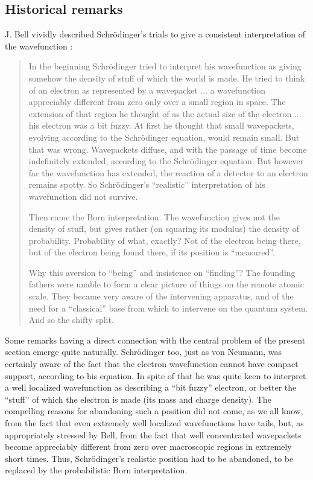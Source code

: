 \documentclass[10pt,a4paper]{article}
\begin{document}
\subsection{Historical remarks} \label{sec131}

J. Bell vividly described Schr\"odinger's trials to give a
consistent interpretation of the wavefunction \cite{bellam}:

\begin{quotation}
In the beginning Schr\"{o}dinger tried to interpret his
wavefunction as giving somehow the density of stuff of which the
world is made. He tried to think of an electron as represented by
a wavepacket ... a wavefunction appreciably different from zero
only over a small region in space. The extension of that region he
thought of as the actual size of the electron ... his electron was
a bit fuzzy. At first he thought that small wavepackets, evolving
according to the Schr\"{o}dinger equation, would remain small. But
that was wrong. Wavepackets diffuse, and with the passage of time
become indefinitely extended, according to the Schr\"{o}dinger
equation. But however far the wavefunction has extended, the
reaction of a detector to an electron remains spotty. So
Schr\"{o}dinger's ``realistic'' interpretation of his wavefunction
did not survive.

Then came the Born interpretation. The wavefunction gives not the
density of stuff, but gives rather (on squaring its modulus) the
density of probability. Probability of what, exactly? Not of the
electron being there, but of the electron being found there, if
its position is ``measured''.

Why this aversion to ``being'' and insistence on ``finding''? The
founding fathers were unable to form a clear picture of things on
the remote atomic scale. They became very aware of the intervening
apparatus, and of the need for a ``classical'' base from which to
intervene on the quantum system. And so the shifty split.
\end{quotation}

Some remarks having a direct connection with the central problem
of the present section emerge quite naturally. Schr\"{o}dinger
too, just as von Neumann, was certainly aware of the fact that the
electron wavefunction cannot have compact support, according to
his equation. In spite of that he was quite keen to interpret a
well localized wavefunction as describing a ``bit fuzzy''
electron, or better the ``stuff'' of which the electron is made
(its mass and charge density). The compelling reasons for
abandoning such a position did not come, as we all know, from the
fact that even extremely well localized wavefunctions have tails,
but, as appropriately stressed by Bell, from the fact that well
concentrated wavepackets become appreciably different from zero
over macroscopic regions in extremely short times. Thus,
Schr\"{o}dinger's realistic position had to be abandoned, to be
replaced by the probabilistic Born interpretation.
\end{document}
